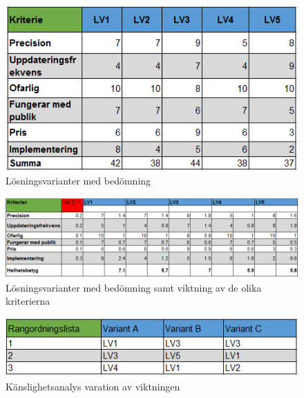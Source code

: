 \documentclass[11pt, a4paper]{report}
\begin{document}
\begin{figure}[H]
	\begin{center}
		\includegraphics [width=12cm,angle=0]{bedomningavkrit.png}
		\caption{Lösningsvarianter med bedömning}
		\label{fig:medbedomning}
	\end{center}
\end{figure}

\begin{figure}[H]
	\begin{center}
		\includegraphics [width=12cm,angle=0]{bedomningvikt.png}
		\caption{Lösningsvarianter med bedömning samt viktning av de olika kriterierna}
		\label{fig:bedomningvikt}
	\end{center}
\end{figure}

\begin{figure}[H]
	\begin{center}
		\includegraphics [width=12cm,angle=0]{rangordning.png}
		\caption{Känslighetsanalys varation av viktningen}
		\label{fig:rangordning}
	\end{center}
\end{figure}
\end{document}
